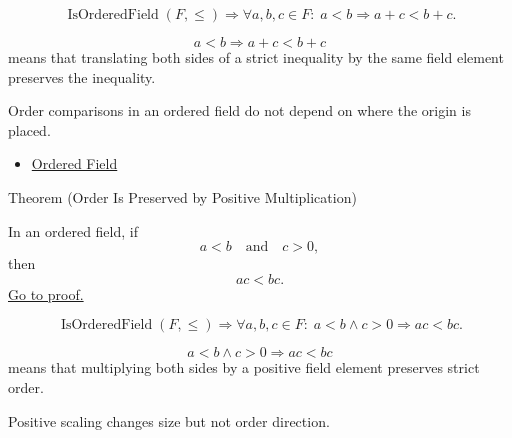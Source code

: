 \begin{remark*}
\[
\operatorname{IsOrderedField}(F,\leq)
\Longrightarrow
\forall a,b,c\in F{:}\; a<b \Longrightarrow a+c<b+c.
\]
\end{remark*}

\begin{remark*}
\[
a<b
\Longrightarrow
a+c<b+c
\]
means that translating both sides of a strict inequality by the same field
element preserves the inequality.
\end{remark*}

\begin{remark*}[Interpretation]
Order comparisons in an ordered field do not depend on where the origin is
placed.
\end{remark*}

\begin{dependencies}
\begin{itemize}
  \item \hyperref[def:ordered-field]{Ordered Field}
\end{itemize}
\end{dependencies}

\begin{theorembox}{Theorem (Order Is Preserved by Positive Multiplication)}
\begin{theorem}\label{thm:ordered-field-positive-multiplication-preserves-order}
In an ordered field, if
\[
a<b
\quad\text{and}\quad
c>0,
\]
then
\[
ac<bc.
\]
\hyperref[prf:ordered-field-positive-multiplication-preserves-order]{Go to proof.}
\end{theorem}
\end{theorembox}

\begin{remark*}
\[
\operatorname{IsOrderedField}(F,\leq)
\Longrightarrow
\forall a,b,c\in F{:}\; a<b\land c>0 \Longrightarrow ac<bc.
\]
\end{remark*}

\begin{remark*}
\[
a<b\land c>0
\Longrightarrow
ac<bc
\]
means that multiplying both sides by a positive field element preserves strict
order.
\end{remark*}

\begin{remark*}[Interpretation]
Positive scaling changes size but not order direction.
\end{remark*}

